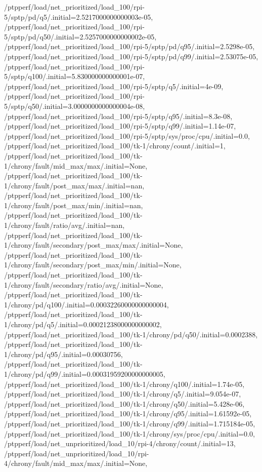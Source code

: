 {    /ptpperf/load/net_prioritized/load_100/rpi-5/sptp/pd/q5/.initial=2.5217000000000003e-05,
    /ptpperf/load/net_prioritized/load_100/rpi-5/sptp/pd/q50/.initial=2.5257000000000002e-05,
    /ptpperf/load/net_prioritized/load_100/rpi-5/sptp/pd/q95/.initial=2.5298e-05,
    /ptpperf/load/net_prioritized/load_100/rpi-5/sptp/pd/q99/.initial=2.53075e-05,
    /ptpperf/load/net_prioritized/load_100/rpi-5/sptp/q100/.initial=5.830000000000001e-07,
    /ptpperf/load/net_prioritized/load_100/rpi-5/sptp/q5/.initial=4e-09,
    /ptpperf/load/net_prioritized/load_100/rpi-5/sptp/q50/.initial=3.0000000000000004e-08,
    /ptpperf/load/net_prioritized/load_100/rpi-5/sptp/q95/.initial=8.3e-08,
    /ptpperf/load/net_prioritized/load_100/rpi-5/sptp/q99/.initial=1.14e-07,
    /ptpperf/load/net_prioritized/load_100/rpi-5/sptp/sys/proc/cpu/.initial=0.0,
    /ptpperf/load/net_prioritized/load_100/tk-1/chrony/count/.initial=1,
    /ptpperf/load/net_prioritized/load_100/tk-1/chrony/fault/mid_max/max/.initial=None,
    /ptpperf/load/net_prioritized/load_100/tk-1/chrony/fault/post_max/max/.initial=nan,
    /ptpperf/load/net_prioritized/load_100/tk-1/chrony/fault/post_max/min/.initial=nan,
    /ptpperf/load/net_prioritized/load_100/tk-1/chrony/fault/ratio/avg/.initial=nan,
    /ptpperf/load/net_prioritized/load_100/tk-1/chrony/fault/secondary/post_max/max/.initial=None,
    /ptpperf/load/net_prioritized/load_100/tk-1/chrony/fault/secondary/post_max/min/.initial=None,
    /ptpperf/load/net_prioritized/load_100/tk-1/chrony/fault/secondary/ratio/avg/.initial=None,
    /ptpperf/load/net_prioritized/load_100/tk-1/chrony/pd/q100/.initial=0.00032260000000000004,
    /ptpperf/load/net_prioritized/load_100/tk-1/chrony/pd/q5/.initial=0.00021238000000000002,
    /ptpperf/load/net_prioritized/load_100/tk-1/chrony/pd/q50/.initial=0.0002388,
    /ptpperf/load/net_prioritized/load_100/tk-1/chrony/pd/q95/.initial=0.00030756,
    /ptpperf/load/net_prioritized/load_100/tk-1/chrony/pd/q99/.initial=0.00031959200000000005,
    /ptpperf/load/net_prioritized/load_100/tk-1/chrony/q100/.initial=1.74e-05,
    /ptpperf/load/net_prioritized/load_100/tk-1/chrony/q5/.initial=9.054e-07,
    /ptpperf/load/net_prioritized/load_100/tk-1/chrony/q50/.initial=5.428e-06,
    /ptpperf/load/net_prioritized/load_100/tk-1/chrony/q95/.initial=1.61592e-05,
    /ptpperf/load/net_prioritized/load_100/tk-1/chrony/q99/.initial=1.715184e-05,
    /ptpperf/load/net_prioritized/load_100/tk-1/chrony/sys/proc/cpu/.initial=0.0,
    /ptpperf/load/net_unprioritized/load_10/rpi-4/chrony/count/.initial=13,
    /ptpperf/load/net_unprioritized/load_10/rpi-4/chrony/fault/mid_max/max/.initial=None,
}
